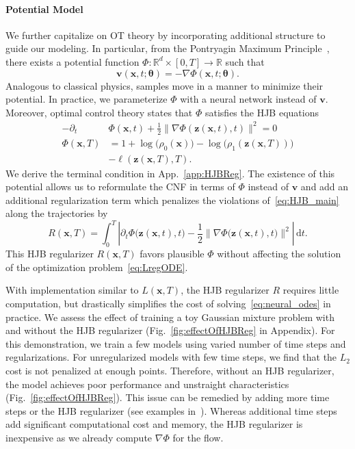 \documentclass[letterpaper]{article}
\newcommand{\bfth}{\boldsymbol{\theta}}
\newcommand{\bfv}{\mathbf{v}}
\newcommand{\bfx}{\boldsymbol{x}}
\newcommand{\bfz}{\boldsymbol{z}}
\def\du{\ensuremath{\mathrm{d}}}
\newcommand{\R}{\ensuremath{\mathds{R}}}
\begin{document}
    \paragraph{Potential Model} 
    We further capitalize on OT theory by incorporating additional structure to guide our modeling. 
    In particular, from the Pontryagin Maximum Principle~\cite{evans1983introduction,evans2010partial}, there exists a potential function $\Phi \colon \R^d \times[0,T] \to\R$ such that
	\begin{equation}
		 \label{eq:pontryagin}
		 \bfv(\bfx,t; \bfth) = - \nabla \Phi(\bfx,t;\bfth).
	\end{equation}
	Analogous to classical physics, samples move in a manner to minimize their potential.
	In practice, we parameterize $\Phi$ with a neural network instead of $\bfv$.
	Moreover, optimal control theory states that $\Phi$ satisfies the HJB equations~\cite{evans1983introduction}
	\begin{equation}
		\label{eq:HJB_main}
		\begin{split}
		 -\partial_t &\Phi(\bfx,t) + \frac{1}{2}\|\nabla \Phi(\bfz(\bfx,t),t)\|^2 = 0
		 \\ 
		\Phi(\bfx,T) &= 1 + \log\big(\rho_0(\bfx)\big)  - \log\big(\rho_1(\bfz(\bfx,T))\big) 
		\\
        &- \ell(\bfz(\bfx,T),T).
		\end{split}
	\end{equation}
	We derive the terminal condition in App.~\ref{app:HJBReg}.
	The existence of this potential allows us to reformulate the CNF in terms of $\Phi$ instead of $\bfv$ and add an additional regularization term which penalizes the violations of~\eqref{eq:HJB_main} along the trajectories by 
	\begin{equation}
		\label{eq:HJB_ode}
		 R(\bfx, T) = \int_0^T \left| \partial_t \Phi \big(\bfz(\bfx,t),t \big) - \frac{1}{2}\|\nabla \Phi \big( \bfz(\bfx,t),t \big)\|^2 \right| \, \du t.
	\end{equation}
    This HJB regularizer $R(\bfx, T)$ favors plausible $\Phi$ without affecting the solution of the optimization problem~\eqref{eq:LregODE}. 
    
    
    With implementation similar to $L(\bfx,T)$, the HJB regularizer $R$ requires little computation, but drastically simplifies the 
    cost of solving~\eqref{eq:neural_odes} in practice.
    We assess the effect of training a toy Gaussian mixture problem with and without the HJB regularizer (Fig.~\ref{fig:effectOfHJBReg} in Appendix). For this demonstration, we train a few models using varied number of time steps and regularizations. For unregularized models with few time steps, we find that the $L_2$ cost is not penalized at enough points. Therefore, without an HJB regularizer, the model achieves poor performance and unstraight characteristics (Fig.~\ref{fig:effectOfHJBReg}). This issue can be remedied by adding more time steps or the HJB regularizer (see examples in~\citealp{yang2019,ruthotto2020machine,lin2020apac}). Whereas additional time steps add significant computational cost and memory, the HJB regularizer is inexpensive as we already compute $\nabla \Phi$ for the flow.
\end{document}
